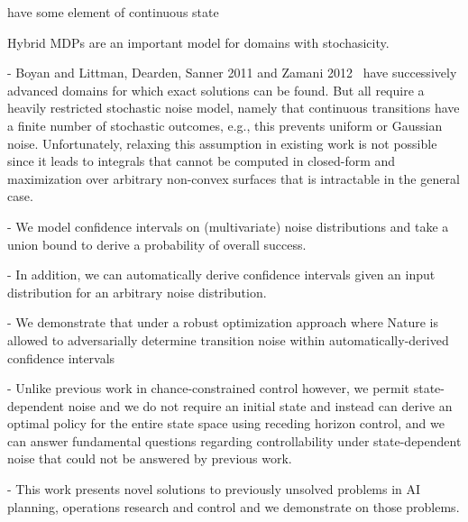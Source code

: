 have some element of continuous state

  Hybrid MDPs are an important model for domains with stochasicity.

- Boyan and Littman, Dearden, Sanner 2011 and 
  Zamani 2012~\cite{sanner_uai11} have successively
  advanced domains for which exact solutions can be found.  But all
  require a heavily restricted stochastic noise model, namely that
  continuous transitions have a finite number of stochastic outcomes,
  e.g., this prevents uniform or Gaussian noise.  Unfortunately,
  relaxing this assumption in existing work is not possible since
  it leads to integrals that cannot be computed in closed-form and
  maximization over arbitrary non-convex surfaces that is intractable 
  in the general case.

- We model confidence intervals on 
  (multivariate) noise distributions and take a union bound to
  derive a probability of overall success.  

- In addition, we can automatically derive confidence intervals given
  an input distribution for an arbitrary noise distribution.

- We demonstrate that under a robust optimization approach where 
  Nature is allowed to adversarially determine transition noise within
  automatically-derived confidence intervals

- Unlike previous work
  in chance-constrained control however, we permit state-dependent
  noise and we do not require an initial state and instead
  can derive an optimal policy
  for the entire state space using receding horizon control, and we
  can answer fundamental questions regarding controllability under
  state-dependent noise that could not be answered by previous work.

- This work presents novel solutions to previously unsolved problems
  in AI planning, operations research and control and we demonstrate
  on those problems.


